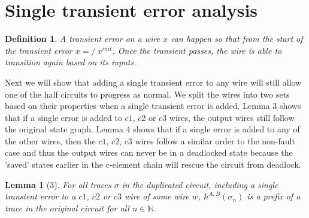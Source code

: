 \documentclass{article}
\newtheorem*{definition}{Definition}
\newtheorem*{lemma}{Lemma}
\begin{document}
\section{Single transient error analysis}
\begin{definition}A transient error on a wire $x$ can happen so that from the start of the transient error $x=/~x^{init}$.  Once the transient passes, the wire is able to transition again based on its inputs. %
\end{definition}
Next we will show that adding a single transient error to any wire will still allow one of the half circuits to progress as normal.  We split the wires into two sets based on their properties when a single transient error is added.  Lemma 3 shows that if a single error is added to $c1$, $c2$ or $c3$ wires, the output wires still follow the original state graph.  Lemma 4 shows that if a single error is added to any of the other wires, then the $c1$, $c2$, $c3$ wires follow a similar order to the non-fault case and thus the output wires can never be in a deadlocked state because the 'saved' states earlier in the c-element chain will rescue the circuit from deadlock.
\begin{lemma}[3]
For all traces $\sigma$ in the duplicated circuit, including a single transient error to a $c1$, $c2$ or $c3$ wire of some wire $w$, $h^{A,B}(\sigma_n)$ is a prefix of a trace in the original circuit for all $n \in \mathbb{N}$.
\end{lemma}
\end{document}
